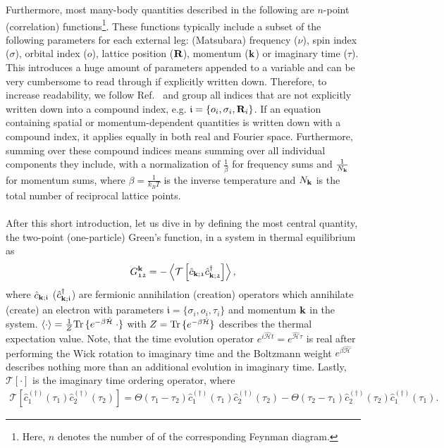 \documentclass[../../main.tex]{subfiles}
\begin{document}
Furthermore, most many-body quantities described in the following are $n$-point (correlation) functions\footnote{Here, $n$ denotes the number of  of the corresponding Feynman diagram.}. These functions typically include a subset of the following parameters for each external leg: (Matsubara) frequency ($\nu$), spin index ($\sigma$), orbital index ($o$), lattice position ($\textbf{R}$), momentum ($\textbf{k}$) or imaginary time ($\tau$). This introduces a huge amount of parameters appended to a variable and can be very cumbersome to read through if explicitly written down. Therefore, to increase readability, we follow Ref.~\cite{Bickers1989} and group all indices that are not explicitly written down into a compound index, e.g. $\mathfrak{i}=\{o_i, \sigma_i, \textbf{R}_i\}$. If an equation containing spatial or momentum-dependent quantities is written down with a compound index, it applies equally in both real and Fourier space. Furthermore, summing over these compound indices means summing over all individual components they include, with a normalization of $\frac 1\beta$ for frequency sums and $\frac{1}{N_{\textbf{k}}}$ for momentum sums, where $\beta=\frac{1}{k_B T}$ is the inverse temperature and $N_{\textbf{k}}$ is the total number of reciprocal lattice points. 
\\\\
After this short introduction, let us dive in by defining the most central quantity, the two-point (one-particle) Green's function, in a system in thermal equilibrium as
\begin{align}\label{eq:one_p_green_expectation_val}
	G_{\mathfrak{12}}^{\textbf{k}}=-\left\langle \mathcal{T}\left [\hat{c}_{\textbf{k};\mathfrak{1}}\hat{c}^{\dagger}_{\textbf{k};\mathfrak{2}}\right ]\right\rangle,
\end{align}
where $\hat{c}_{\textbf{k};\mathfrak{i}}$ ($\hat{c}^{\dagger}_{\textbf{k};\mathfrak{i}}$) are fermionic annihilation (creation) operators which annihilate (create) an electron with parameters $\mathfrak{i}=\{\sigma_i, o_i, \tau_i\}$ and momentum $\textbf{k}$ in the system. $\left\langle \cdot\right\rangle=\frac{1}{Z}\mathrm{Tr}\, \{ e^{-\beta\hat{\mathcal{H}}}\;\cdot \}$ with $Z=\mathrm{Tr}\, \{ e^{-\beta\hat{\mathcal{H}}}\}$ describes the thermal expectation value. Note, that the time evolution operator $e^{i\hat{\mathcal{H}}t}=e^{\hat{\mathcal{H}}\tau}$ is real after performing the Wick rotation to imaginary time and the Boltzmann weight $e^{\beta\hat{\mathcal{H}}}$ describes nothing more than an additional evolution in imaginary time. Lastly, $\mathcal{T}[\cdot]$ is the imaginary time ordering operator, where
\begin{align}
	\mathcal{T}\left [\hat{c}^{(\dagger)}_{\mathfrak{1}}(\tau_1)\hat{c}^{(\dagger)}_{\mathfrak{2}}(\tau_2)\right ]=\Theta(\tau_1-\tau_2)\hat{c}^{(\dagger)}_{\mathfrak{1}}(\tau_1)\hat{c}^{(\dagger)}_{\mathfrak{2}}(\tau_2)-\Theta(\tau_2-\tau_1)\hat{c}^{(\dagger)}_{\mathfrak{2}}(\tau_2)\hat{c}^{(\dagger)}_{\mathfrak{1}}(\tau_1).
\end{align}
\end{document}
